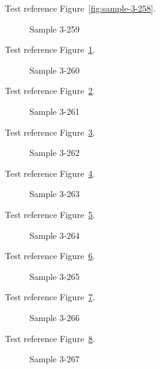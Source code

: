 Test reference Figure~\ref{fig:sample-3-258}.

\begin{figure}[tbhp]
\caption{Sample 3-259}
\label{fig:sample-3-259}
\end{figure}

Test reference Figure~\ref{fig:sample-3-259}.

\begin{figure}[tbhp]
\caption{Sample 3-260}
\label{fig:sample-3-260}
\end{figure}

Test reference Figure~\ref{fig:sample-3-260}.

\begin{figure}[tbhp]
\caption{Sample 3-261}
\label{fig:sample-3-261}
\end{figure}

Test reference Figure~\ref{fig:sample-3-261}.

\begin{figure}[tbhp]
\caption{Sample 3-262}
\label{fig:sample-3-262}
\end{figure}

Test reference Figure~\ref{fig:sample-3-262}.

\begin{figure}[tbhp]
\caption{Sample 3-263}
\label{fig:sample-3-263}
\end{figure}

Test reference Figure~\ref{fig:sample-3-263}.

\begin{figure}[tbhp]
\caption{Sample 3-264}
\label{fig:sample-3-264}
\end{figure}

Test reference Figure~\ref{fig:sample-3-264}.

\begin{figure}[tbhp]
\caption{Sample 3-265}
\label{fig:sample-3-265}
\end{figure}

Test reference Figure~\ref{fig:sample-3-265}.

\begin{figure}[tbhp]
\caption{Sample 3-266}
\label{fig:sample-3-266}
\end{figure}

Test reference Figure~\ref{fig:sample-3-266}.

\begin{figure}[tbhp]
\caption{Sample 3-267}
\label{fig:sample-3-267}
\end{figure}

